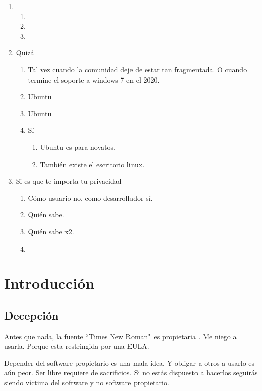 \documentclass[12pt, twoside]{article}
\begin{document}
\begin{enumerate}
	\item
		\begin{enumerate}
			\item
			\item
			\item
		\end{enumerate}
	\item Quizá
		\begin{enumerate}
			\item Tal vez cuando la comunidad deje de estar tan fragmentada.
				O cuando termine el soporte a windows 7 en el 2020.
			\item Ubuntu
			\item Ubuntu
			\item Sí
				\begin{enumerate}
					\item Ubuntu es para novatos.
					\item También existe el escritorio linux.
				\end{enumerate}
		\end{enumerate}
	\item Si es que te importa tu privacidad
		\begin{enumerate}
			\item Cómo usuario no, como desarrollador sí.
			\item Quién sabe.
			\item Quién sabe x2.
			\item
		\end{enumerate}
\end{enumerate}

\fi
\section{Introducción}%
\label{sec:Introducción}
\subsection{Decepción}%

Antes que nada, la fuente ``Times New Roman"\ es propietaria \citet{NEWROMAN}.
Me niego a usarla.
Porque esta restringida por una EULA.

Depender del software propietario es una mala idea.
Y obligar a otros a usarlo es aún peor.
Ser libre requiere de sacrificios.
Si no estás dispuesto a hacerlos seguirás siendo víctima del software y no software propietario.
\end{document}
